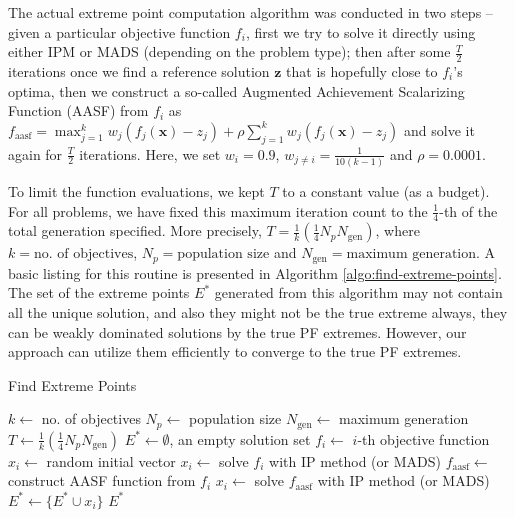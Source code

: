 \documentclass{sig-alternate-05-2015}
\begin{document}
The actual extreme point computation algorithm was conducted in two steps -- given a particular objective function \(f_i\), first we try to solve it directly using either IPM or MADS (depending on the problem type); then after some \(\frac{T}{2}\) iterations once we find a reference solution \(\mathbf{z}\) that is hopefully close to \(f_i\)'s optima, then we construct a so-called Augmented Achievement Scalarizing Function (AASF) \cite{asf} from \(f_i\) as \(f_{\text{aasf}} = \max_{j=1}^k w_j(f_j(\mathbf{x}) - z_j) + \rho \sum_{j=1}^k w_j(f_j(\mathbf{x}) - z_j)\) and solve it again for \(\frac{T}{2}\) iterations. Here, we set \(w_i = 0.9\), \(w_{j \neq i} = \frac{1}{10(k-1)}\) and \(\rho = 0.0001\). 

To limit the function evaluations, we kept \(T\) to a constant value (as a budget). For all problems, we have fixed this maximum iteration count to the \(\frac{1}{4}\)-th of the total generation specified. More precisely, $T = \frac{1}{k}(\frac{1}{4}N_p N_{\text{gen}})$, where $k = \text{no. of objectives}$, $N_p = \text{population size}$ and $N_{\text{gen}} = \text{maximum generation}$. A basic listing for this routine is presented in Algorithm \ref{algo:find-extreme-points}. The set of the extreme points \(E^\ast\) generated from this algorithm may not contain all the unique solution, and also they might not be the true extreme always, they can be weakly dominated solutions by the true PF extremes. However, our approach can utilize them efficiently to converge to the true PF extremes.
%
\begin{algorithm}[!tp]
\caption{Find Extreme Points}
\label{algo:find-extreme-points}
\begin{algorithmic}[1]
	\STATE $k \leftarrow$ no. of objectives
	\STATE $N_p \leftarrow$ population size
	\STATE $N_{\text{gen}} \leftarrow$ maximum generation
	\STATE $T \leftarrow \frac{1}{k}(\frac{1}{4}N_p N_{\text{gen}})$
	\STATE $E^\ast \leftarrow \emptyset$, an empty solution set
		\STATE $f_i \leftarrow$ $i$-th objective function
		\STATE $x_i \leftarrow $ random initial vector
		\REPEAT
			\STATE $x_i \leftarrow$ solve $f_i$ with IP method (or MADS) 
		\STATE $f_{\text{aasf}} \leftarrow $ construct AASF function from $f_i$
		\REPEAT
			\STATE $x_i \leftarrow$ solve $f_{\text{aasf}}$ with  IP method (or MADS)
		\STATE $E^\ast \leftarrow \{E^\ast \cup x_i\}$
	\ENDFOR
	\RETURN $E^\ast$
\end{algorithmic}
\end{algorithm}
%
\end{document}
